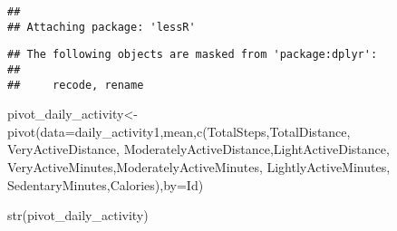 \documentclass[
]{article}
\newenvironment{Shaded}{\begin{snugshade}}{\end{snugshade}}
\newcommand{\AttributeTok}[1]{\textcolor[rgb]{0.77,0.63,0.00}{#1}}
\newcommand{\FunctionTok}[1]{\textcolor[rgb]{0.00,0.00,0.00}{#1}}
\newcommand{\NormalTok}[1]{#1}
\newcommand{\OtherTok}[1]{\textcolor[rgb]{0.56,0.35,0.01}{#1}}
\begin{document}
\begin{verbatim}
## 
## Attaching package: 'lessR'
\end{verbatim}

\begin{verbatim}
## The following objects are masked from 'package:dplyr':
## 
##     recode, rename
\end{verbatim}

\begin{Shaded}
\begin{Highlighting}[]
\NormalTok{pivot\_daily\_activity}\OtherTok{\textless{}{-}}\FunctionTok{pivot}\NormalTok{(}\AttributeTok{data=}\NormalTok{daily\_activity1,mean,}\FunctionTok{c}\NormalTok{(TotalSteps,TotalDistance, VeryActiveDistance, ModeratelyActiveDistance,LightActiveDistance, VeryActiveMinutes,ModeratelyActiveMinutes, LightlyActiveMinutes, SedentaryMinutes,Calories),}\AttributeTok{by=}\NormalTok{Id)}
\end{Highlighting}
\end{Shaded}

\begin{Shaded}
\begin{Highlighting}[]
\FunctionTok{str}\NormalTok{(pivot\_daily\_activity)}
\end{Highlighting}
\end{Shaded}
\end{document}
